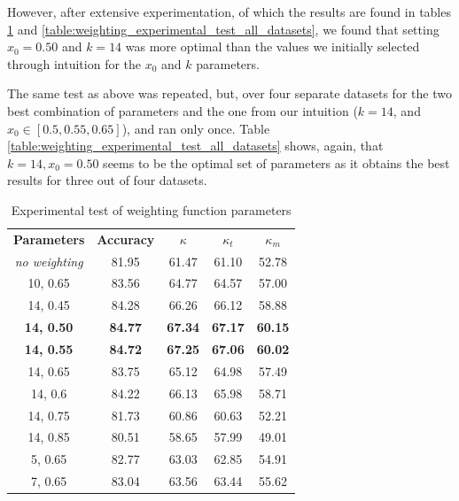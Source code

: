 However, after extensive experimentation, of which the results are found in tables \ref{table:weighting_experimental_test} and \ref{table:weighting_experimental_test_all_datasets}, we found that setting \textbf{$x_0=0.50$} and \textbf{$k=14$} was more optimal than the values we initially selected through intuition for the $x_0$ and $k$ parameters.

The same test as above was repeated, but, over four separate datasets for the two best combination of parameters and the one from our intuition ($k=14$, and $x_0 \in [0.5, 0.55, 0.65]$), and ran only once. Table \ref{table:weighting_experimental_test_all_datasets} shows, again, that $k=14, x_0=0.50$ seems to be the optimal set of parameters as it obtains the best results for three out of four datasets.

\begin{table}[]
\caption{\label{table:weighting_experimental_test}Experimental test of weighting function parameters}
\centering
\begin{tabular}{|c|c|c|c|c|}
\hline
\textbf{Parameters} & \textbf{Accuracy} & \textbf{$\kappa$} & \textbf{$\kappa_t$} & \textbf{$\kappa_m$} \\ \hhline{=====}
\textit{no weighting}&81.95&61.47&61.10&52.78 \\ \hline
10, 0.65&83.56&64.77&64.57&57.00 \\ \hline
14, 0.45&84.28&66.26&66.12&58.88 \\ \hline
\textbf{14, 0.50}&\textbf{84.77}&\textbf{67.34}&\textbf{67.17}&\textbf{60.15} \\ \hline
\textbf{14, 0.55}&\textbf{84.72}&\textbf{67.25}&\textbf{67.06}&\textbf{60.02} \\ \hline
14, 0.65&83.75&65.12&64.98&57.49 \\ \hline
14, 0.6&84.22&66.13&65.98&58.71 \\ \hline
14, 0.75&81.73&60.86&60.63&52.21 \\ \hline
14, 0.85&80.51&58.65&57.99&49.01 \\ \hline
5, 0.65&82.77&63.03&62.85&54.91 \\ \hline
7, 0.65&83.04&63.56&63.44&55.62 \\ \hline
\end{tabular}
\end{table}

